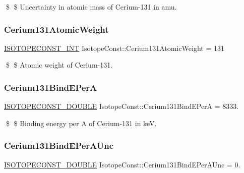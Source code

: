 \$ \$ Uncertainty in atomic mass of Cerium-\/131 in amu. \mbox{\label{group___isotope_const-_cerium-_ce131_ga2aa45d6ee3f18cfe0f86491df2cc4fc2}} 
\subsubsection{\texorpdfstring{Cerium131\+Atomic\+Weight}{Cerium131AtomicWeight}}
{\footnotesize\ttfamily \mbox{\hyperlink{group___isotope_const-_macros_ga5f18360b3e99483a35c32d789e62621c}{I\+S\+O\+T\+O\+P\+E\+C\+O\+N\+S\+T\+\_\+\+I\+NT}} Isotope\+Const\+::\+Cerium131\+Atomic\+Weight = 131}

\$ \$ Atomic weight of Cerium-\/131. \mbox{\label{group___isotope_const-_cerium-_ce131_ga10268094af19adc0468c31acd42d385e}} 
\subsubsection{\texorpdfstring{Cerium131\+Bind\+E\+PerA}{Cerium131BindEPerA}}
{\footnotesize\ttfamily \mbox{\hyperlink{group___isotope_const-_macros_ga8f45a7272ce02c0b4c65c44636ed719a}{I\+S\+O\+T\+O\+P\+E\+C\+O\+N\+S\+T\+\_\+\+D\+O\+U\+B\+LE}} Isotope\+Const\+::\+Cerium131\+Bind\+E\+PerA = 8333.}

\$ \$ Binding energy per A of Cerium-\/131 in keV. \mbox{\label{group___isotope_const-_cerium-_ce131_ga6a80198f32be5c63b3c37d374814a0f1}} 
\subsubsection{\texorpdfstring{Cerium131\+Bind\+E\+Per\+A\+Unc}{Cerium131BindEPerAUnc}}
{\footnotesize\ttfamily \mbox{\hyperlink{group___isotope_const-_macros_ga8f45a7272ce02c0b4c65c44636ed719a}{I\+S\+O\+T\+O\+P\+E\+C\+O\+N\+S\+T\+\_\+\+D\+O\+U\+B\+LE}} Isotope\+Const\+::\+Cerium131\+Bind\+E\+Per\+A\+Unc = 0.}

